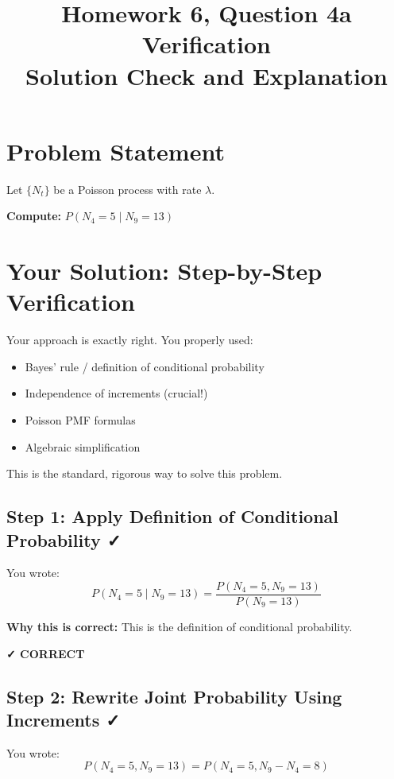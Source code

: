 \documentclass[11pt]{article}
\title{\textbf{Homework 6, Question 4a Verification} \\ \large Solution Check and Explanation}
\author{}
\date{}
\begin{document}
\maketitle

\section{Problem Statement}

Let $\{N_t\}$ be a Poisson process with rate $\lambda$.

\textbf{Compute:} $P(N_4 = 5 \mid N_9 = 13)$

\section{Your Solution: Step-by-Step Verification}

\begin{tcolorbox}[colback=green!10!white,colframe=green!75!black,title=\textbf{VERDICT: YOUR WORK IS CORRECT! ✓}]
Your approach is exactly right. You properly used:
\begin{itemize}
    \item Bayes' rule / definition of conditional probability
    \item Independence of increments (crucial!)
    \item Poisson PMF formulas
    \item Algebraic simplification
\end{itemize}
This is the standard, rigorous way to solve this problem.
\end{tcolorbox}

\subsection{Step 1: Apply Definition of Conditional Probability ✓}

You wrote:
\[
P(N_4 = 5 \mid N_9 = 13) = \frac{P(N_4 = 5, N_9 = 13)}{P(N_9 = 13)}
\]

\textbf{Why this is correct:} This is the definition of conditional probability.

\textcolor{green!60!black}{\textbf{✓ CORRECT}}

\subsection{Step 2: Rewrite Joint Probability Using Increments ✓}

You wrote:
\[
P(N_4 = 5, N_9 = 13) = P(N_4 = 5, N_9 - N_4 = 8)
\]
\end{document}
